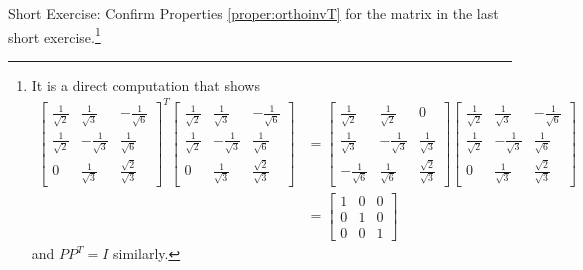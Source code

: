 Short Exercise: Confirm Properties \ref{proper:orthoinvT} for the matrix in the last short exercise.\footnote{It is a direct computation that shows
\begin{align*}
\begin{bmatrix}
\frac{1}{\sqrt{2}} & \frac{1}{\sqrt{3}} & -\frac{1}{\sqrt{6}} \\
\frac{1}{\sqrt{2}} & -\frac{1}{\sqrt{3}} & \frac{1}{\sqrt{6}} \\
0 & \frac{1}{\sqrt{3}} & \frac{\sqrt{2}}{\sqrt{3}}
\end{bmatrix}^T
\begin{bmatrix}
\frac{1}{\sqrt{2}} & \frac{1}{\sqrt{3}} & -\frac{1}{\sqrt{6}} \\
\frac{1}{\sqrt{2}} & -\frac{1}{\sqrt{3}} & \frac{1}{\sqrt{6}} \\
0 & \frac{1}{\sqrt{3}} & \frac{\sqrt{2}}{\sqrt{3}}
\end{bmatrix} &=
\begin{bmatrix}
\frac{1}{\sqrt{2}} & \frac{1}{\sqrt{2}} & 0 \\
\frac{1}{\sqrt{3}} & -\frac{1}{\sqrt{3}} & \frac{1}{\sqrt{3}} \\
-\frac{1}{\sqrt{6}} & \frac{1}{\sqrt{6}} & \frac{\sqrt{2}}{\sqrt{3}}
\end{bmatrix}
\begin{bmatrix}
\frac{1}{\sqrt{2}} & \frac{1}{\sqrt{3}} & -\frac{1}{\sqrt{6}} \\
\frac{1}{\sqrt{2}} & -\frac{1}{\sqrt{3}} & \frac{1}{\sqrt{6}} \\
0 & \frac{1}{\sqrt{3}} & \frac{\sqrt{2}}{\sqrt{3}}
\end{bmatrix} \\
&=
\begin{bmatrix}
1 & 0 & 0 \\
0 & 1 & 0 \\
0 & 0 & 1
\end{bmatrix}
\end{align*}
and $PP^T = I$ similarly.}


